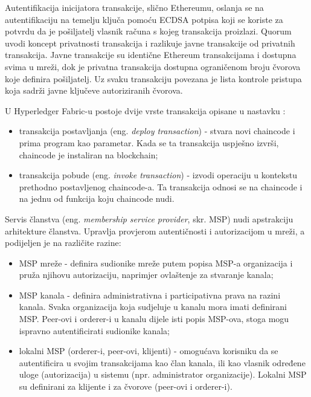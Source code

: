 \documentclass[times, utf8, diplomski]{fer}
\begin{document}
Autentifikacija inicijatora transakcije, slično Ethereumu, oslanja se na autentifikaciju na temelju ključa pomoću ECDSA potpisa koji se koriste za potvrdu da je pošiljatelj vlasnik računa s kojeg transakcija proizlazi. Quorum uvodi koncept privatnosti transakcija i razlikuje javne transakcije od privatnih transakcija. Javne transakcije su identične Ethereum transakcijama i dostupna svima u mreži, dok je privatna transakcija dostupna ograničenom broju čvorova koje definira pošiljatelj. Uz svaku transakciju povezana je lista kontrole pristupa koja sadrži javne ključeve autoriziranih čvorova.

U Hyperledger Fabric-u postoje dvije vrste transakcija opisane u nastavku \cite{lagarde2019security}:

\begin{itemize}

\item transakcija postavljanja (eng. \textit{deploy transaction}) - stvara novi chaincode i prima program kao parametar. Kada se ta transakcija uspješno izvrši, chaincode je instaliran na blockchain;

\item transakcija pobude (eng. \textit{invoke transaction}) - izvodi operaciju u kontekstu prethodno postavljenog chaincode-a. Ta transakcija odnosi se na chaincode i na jednu od funkcija koju chaincode nudi.

\end{itemize}

Servis članstva (eng.  \textit{membership service provider}, skr. MSP) nudi apstrakciju arhitekture članstva. Upravlja provjerom autentičnosti i autorizacijom u mreži, a podijeljen je na različite razine:

\begin{itemize}

\item MSP mreže - definira sudionike mreže putem popisa MSP-a organizacija i pruža njihovu autorizaciju, naprimjer ovlaštenje za stvaranje kanala;

\item MSP kanala - definira administrativna i participativna prava na razini kanala. Svaka organizacija koja sudjeluje u kanalu mora imati definirani MSP. Peer-ovi i orderer-i u kanalu dijele isti popis MSP-ova, stoga mogu ispravno autentificirati sudionike kanala;

\item lokalni MSP (orderer-i, peer-ovi, klijenti) - omogućava korisniku da se autentificira u svojim transakcijama kao član kanala, ili kao vlasnik određene uloge (autorizacija) u sistemu (npr. administrator organizacije). Lokalni MSP su definirani za klijente i za čvorove (peer-ovi i orderer-i).

\end{itemize}
\end{document}
